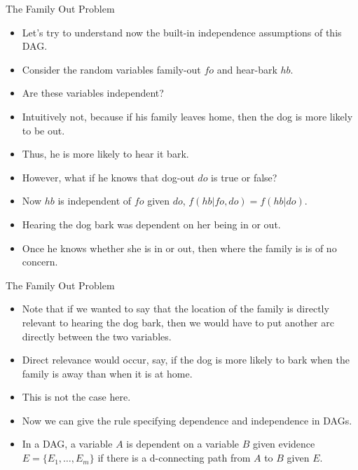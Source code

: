 \documentclass[handout]{beamer}
\begin{document}
\begin{frame}{The Family Out Problem}
\scriptsize{



\begin{itemize}
\item Let's try to understand now the built-in independence assumptions of this DAG.

\item Consider the random variables family-out $fo$ and hear-bark $hb$.

\item Are these variables independent? 

\item Intuitively not, because if his family leaves home, then the dog is more likely to be out.
\item Thus, he is more likely to hear it bark. 

\item However, what if he knows that dog-out $do$ is true or false?

\item Now $hb$ is independent of $fo$ given $do$, $f(hb | fo, do) = f(hb | do)$.

\item Hearing the dog bark was dependent on her being in or out.

\item Once he knows whether she is in or out, then where the family is is of no concern.





 
\end{itemize}



} 

\end{frame}


\begin{frame}{The Family Out Problem}
\scriptsize{



\begin{itemize}
\item Note that if we wanted to say that the location of the family is directly relevant to hearing the dog bark, then we would have to put another arc directly between the two variables.
\item Direct relevance would occur, say, if the dog is more likely to bark when the family is away than when it is at home.
\item This is not the case here.

\item Now we can give the rule specifying dependence and independence in DAGs.

\item In a DAG, a variable $A$ is dependent on a variable $B$ given evidence $E=\{E_1,\dots,E_m\}$ if there is a d-connecting path from $A$ to $B$ given $E$.

 
\end{itemize}



} 

\end{frame}
\end{document}
